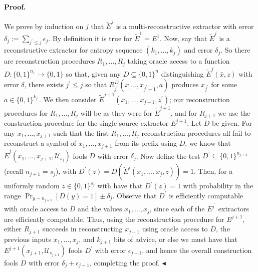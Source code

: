 \documentclass[10pt,a4paper]{article}
\begin{document}




\par\medskip\noindent\textbf{Proof.}\par




We prove by induction on $j$ that $\tilde{E}^{j}$ is a multi-reconstructive extractor with error $\delta_{j}:=\sum_{j^{\prime}\leq j}\epsilon_{j}$. By definition it is true for $\tilde{E}^{1}=E^{1}$.
Now, say that $\tilde{E}^{j}$ is a reconstructive extractor for entropy sequence $(k_{1},\ldots,k_{j})$ and error $\delta_{j}$. So there are reconstruction procedures $R_{1},\ldots,R_{j}$ taking oracle access to a function $D:\{0,1\}^{n_{1}}\to\{0,1\}$ so that, given any $D\subseteq\{0,1\}^{n}$ distinguishing $\tilde{E}^{j}(\bar{x},z)$ with error $\delta$, there exists $j^{\prime}\leq j$ so that $R_{j^{\prime}}^{D}(x_{,}\ldots,x_{j^{\prime}-1},a)$ produces $x_{j^{\prime}}$ for some $a\in\{0,1\}^{k_{j^{\prime}}}$. We then consider $\tilde{E}^{j+1}(x_{1},\ldots,x_{j+1},z^{\prime})$; our reconstruction procedures for $R_{1},\ldots,R_{j}$ will be as they were for $\tilde{E}^{j+1}$, and for $R_{j+1}$ we use the construction procedure for the single source extractor $E^{j+1}$.
Let $D$ be given. For any $x_{1},\ldots,x_{j+1}$ such that the first $R_{1},\ldots,R_{j}$ reconstruction procedures all fail to reconstruct a symbol of $x_{1},\ldots,x_{j+1}$ from its prefix using $D$, we know that $\tilde{E}^{j}(x_{1},\ldots,x_{j+1},\mathcal{U}_{s_{j}})$ fools $D$ with error $\delta_{j}$. Now define the test $D^{\prime}\subseteq\{0,1\}^{n_{j+1}}$ (recall $n_{j+1}=s_{j}$), with $D^{\prime}(z)=D(\tilde{E}^{j}(x_{1},\ldots,x_{j},z))=1$. Then, for a uniformly random $z\in\{0,1\}^{s_{j}}$ with have that $D^{\prime}(z)=1$ with probability in the range $\Pr_{y\sim n_{j+1}}[D(y)=1]\pm\delta_{j}$. Observe that $D^{\prime}$ is efficiently computable with oracle access to $D$ and the values $x_{1},\ldots,x_{j}$, since each of the $E^{j^{\prime}}$ extractors are efficiently computable. Thus, using the reconstruction procedure for $E^{j+1}$, either $R_{j+1}$ succeeds in reconstructing $x_{j+1}$ using oracle access to $D$, the previous inputs $x_{1},\ldots,x_{j}$, and $k_{j+1}$ bits of advice, or else we must have that $E^{j+1}(x_{j+1},\mathcal{U}_{s_{j+1}})$ fools $D^{\prime}$ with error $\epsilon_{j+1}$, and hence the overall construction fools $D$ with error $\delta_{j}+\epsilon_{j+1}$, completing the proof.
$\blacktriangleleft$\par
\end{document}
